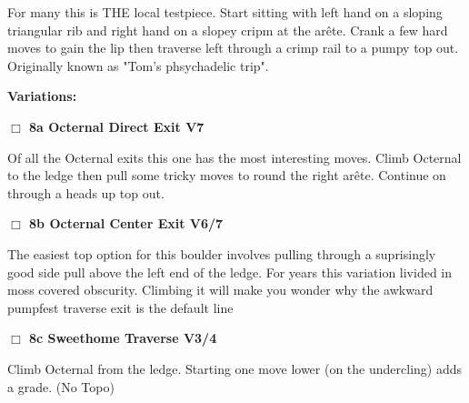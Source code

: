 \begin{multicols}{2}
\begin{adjustwidth}{1.3em}{}
For many this is THE local testpiece. Start sitting with left hand on a sloping triangular rib and right hand on a slopey cripm at the arête. Crank a few hard moves to gain the lip then traverse left through a crimp rail to a pumpy top out. Originally known as "Tom's phsychadelic trip".
\end{adjustwidth}


\begin{adjustwidth}{0.5cm}{}				
\needspace{4em}
\textbf{Variations:} \newline

\needspace{2em}
\label{vr:Octernal Direct Exit}
\colorbox{Goldenrod!20}{
\parbox{0.95\linewidth}{
\hspace{-1ex}\textbf{$\Box$
8a Octernal Direct Exit V7  
}}}
\begin{adjustwidth}{1.3em}{}			

Of all the Octernal exits this one has the most interesting moves. Climb Octernal to the ledge then pull some tricky moves to round the right arête. Continue on through a heads up top out.
\end{adjustwidth}




\needspace{2em}
\label{vr:Octernal Center Exit}
\colorbox{Goldenrod!20}{
\parbox{0.95\linewidth}{
\hspace{-1ex}\textbf{$\Box$
8b Octernal Center Exit V6/7  
}}}
\begin{adjustwidth}{1.3em}{}			

The easiest top option for this boulder involves pulling through a suprisingly good side pull above the left end of the ledge. For years this variation livided in moss covered obscurity. Climbing it will make you wonder why the awkward pumpfest traverse exit is the default line
\end{adjustwidth}




\needspace{2em}
\label{vr:Sweethome Traverse}
\colorbox{RoyalBlue!20}{
\parbox{0.95\linewidth}{
\hspace{-1ex}\textbf{$\Box$
8c Sweethome Traverse V3/4  
}}}
\begin{adjustwidth}{1.3em}{}			

Climb Octernal from the ledge. Starting one move lower (on the undercling) adds a grade.
  (No Topo)
\end{adjustwidth}




\end{adjustwidth}
\end{multicols}
